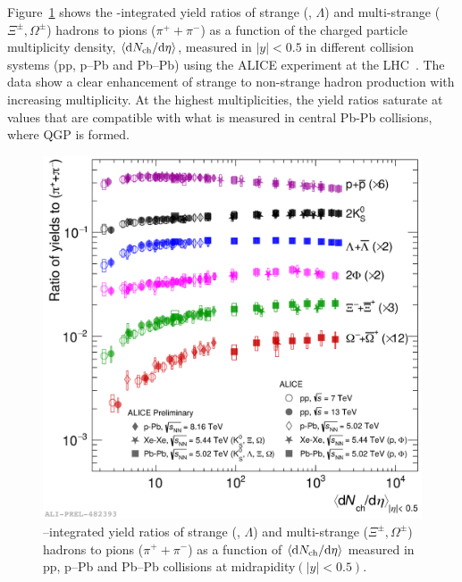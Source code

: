 Figure~\ref{fig:StrangenessEnhancement} shows the \pt-integrated yield ratios of strange (\kzs, $\Lambda$) and multi-strange ($\Xi^\pm, \Omega^\pm$) hadrons to pions ($\pi^++\pi^-$) as a function of the charged particle multiplicity density, $\braket{\mathrm{d} N_\mathrm{ch}/\mathrm{d}\eta}$, measured in $\lvert y\rvert<0.5$ in different collision systems (pp, p--Pb and Pb--Pb) using the ALICE experiment at the LHC~\cite{ALICE:2016fzo}. The data show a clear enhancement of strange to non-strange hadron production with increasing multiplicity. At the highest multiplicities, the yield ratios saturate at values that are compatible with what is measured in central Pb-Pb collisions, where QGP is formed.

\begin{figure}[htb!]
  \centering
  \includegraphics[width=0.5\linewidth]{Figures/Chapter 1/img_ToPionRatios_1.pdf}
  \caption{\pt--integrated yield ratios of strange (\kzs, $\Lambda$) and multi-strange ($\Xi^\pm, \Omega^\pm$) hadrons to pions ($\pi^++\pi^-$) as a function of $\braket{\mathrm{d} N_\mathrm{ch}/\mathrm{d}\eta}$ measured in pp, p--Pb and Pb--Pb collisions at midrapidity$(\lvert y\rvert<0.5)$.}
  \label{fig:StrangenessEnhancement}
\end{figure}


